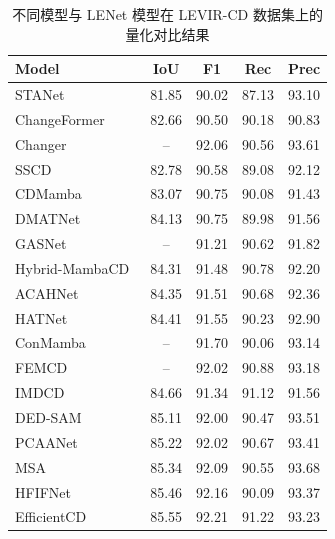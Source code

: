 \begin{table}[!htbp]
  \centering
  \caption{不同模型与 LENet 模型在 LEVIR-CD 数据集上的量化对比结果}
  \label{tab:lenet_levir}
  \begin{tabular}{lcccc}
    \toprule
    Model                   &   IoU   &   F1   &   Rec   &  Prec   \\
    \midrule
    STANet~\cite{chen_spatial-temporal_2020}        &  81.85  &  90.02 &  87.13  &  93.10  \\
    ChangeFormer~\cite{bandara2022transformer}  &  82.66  &  90.50 &  90.18  &  90.83  \\
    Changer~\cite{Fang2022ChangerFI}       &   --    &  92.06 &  90.56  &  93.61  \\
    SSCD~\cite{Wang2024SummatorSubtractorNM}          &  82.78  &  90.58 &  89.08  &  92.12  \\
    CDMamba~\cite{zhang_cdmamba_2025}       &  83.07  &  90.75 &  90.08  &  91.43  \\
    DMATNet~\cite{Song2022RemoteSI}       &  84.13  &  90.75 &  89.98  &  91.56  \\
    GASNet~\cite{zhang_global-aware_2023}        &   --    &  91.21 &  90.62  &  91.82  \\
    Hybrid-MambaCD~\cite{Feng2025HybridMambaCDHM} &  84.31  &  91.48 &  90.78  &  92.20  \\
    ACAHNet~\cite{Zhang2023AsymmetricCH}       &  84.35  &  91.51 &  90.68  &  92.36  \\
    HATNet~\cite{Xu2024HybridAT}        &  84.41  &  91.55 &  90.23  &  92.90  \\
    ConMamba~\cite{Dong2024ConMambaCA}      &   --    &  91.70 &  90.06  &  93.14  \\
    FEMCD~\cite{Xing2025FrequencyEnhancedMF}         &   --    &  92.02 &  90.88  &  93.18  \\
    IMDCD~\cite{Liu2024IterativeMD}         &  84.66  &  91.34 &  91.12  &  91.56  \\
    DED-SAM~\cite{Qiu2025DEDSAMAdaptingSA}       &  85.11  &  92.00 &  90.47  &  93.51  \\
    PCAANet~\cite{Xu2023ProgressiveCA}       &  85.22  &  92.02 &  90.67  &  93.41  \\
    MSA~\cite{Huang2025MSAMS}           &  85.34  &  92.09 &  90.55  &  93.68  \\
    HFIFNet~\cite{Han2025HFIFNetHF}       &  85.46  &  92.16 &  90.09  &  93.37  \\
    EfficientCD~\cite{dong_efficientcd_2024}   &  85.55  &  92.21 &  91.22  &  93.23  \\

\end{tabular}
\end{table}

